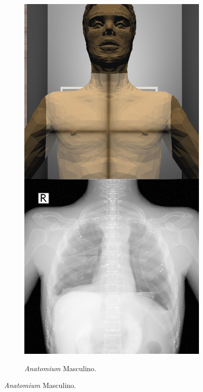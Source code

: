 \begin{figure}[h]
\begin{subfigure}[b]{0.24\linewidth}
    \end{subfigure}
     \begin{subfigure}[b]{0.24\linewidth}
        \centering
        {\includegraphics[width=\linewidth]{IMG/anaex.png}}
        \caption{\emph{Anatomium} Masculino.}

\end{subfigure}
\end{figure}
